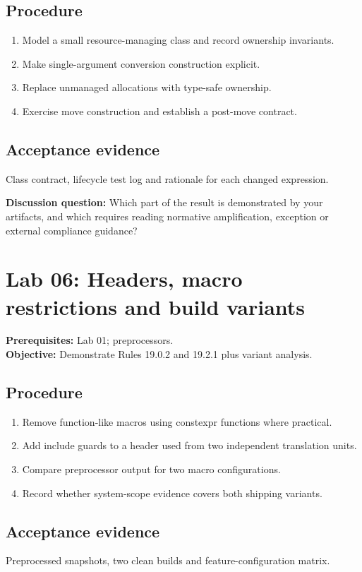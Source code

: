 \documentclass[10pt,letterpaper]{article}
\begin{document}
\subsection{Procedure}
\begin{enumerate}
\item Model a small resource-managing class and record ownership invariants.
\item Make single-argument conversion construction explicit.
\item Replace unmanaged allocations with type-safe ownership.
\item Exercise move construction and establish a post-move contract.
\end{enumerate}

\subsection{Acceptance evidence}
Class contract, lifecycle test log and rationale for each changed expression.

\textbf{Discussion question:} Which part of the result is demonstrated by your artifacts, and which requires reading normative amplification, exception or external compliance guidance?\par

\section{Lab 06: Headers, macro restrictions and build variants}
\textbf{Prerequisites:} Lab 01; preprocessors.\\\textbf{Objective:} Demonstrate Rules 19.0.2 and 19.2.1 plus variant analysis.

\subsection{Procedure}
\begin{enumerate}
\item Remove function-like macros using constexpr functions where practical.
\item Add include guards to a header used from two independent translation units.
\item Compare preprocessor output for two macro configurations.
\item Record whether system-scope evidence covers both shipping variants.
\end{enumerate}

\subsection{Acceptance evidence}
Preprocessed snapshots, two clean builds and feature-configuration matrix.
\end{document}
